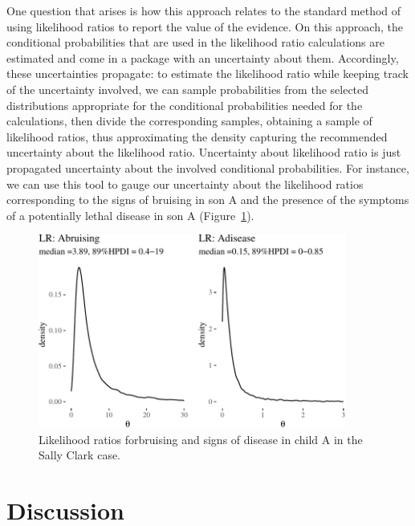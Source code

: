 \documentclass[
  letterpaper,
  DIV=11,
  numbers=noendperiod]{scrartcl}
\begin{document}
One question that arises is how this approach relates to the standard
method of using likelihood ratios to report the value of the evidence.
On this approach, the conditional probabilities that are used in the
likelihood ratio calculations are estimated and come in a package with
an uncertainty about them. Accordingly, these uncertainties propagate:
to estimate the likelihood ratio while keeping track of the uncertainty
involved, we can sample probabilities from the selected distributions
appropriate for the conditional probabilities needed for the
calculations, then divide the corresponding samples, obtaining a sample
of likelihood ratios, thus approximating the density capturing the
recommended uncertainty about the likelihood ratio. Uncertainty about
likelihood ratio is just propagated uncertainty about the involved
conditional probabilities. For instance, we can use this tool to gauge
our uncertainty about the likelihood ratios corresponding to the signs
of bruising in son A and the presence of the symptoms of a potentially
lethal disease in son A (Figure~\ref{fig-sclrs}).

\begin{figure}[H]

{\centering \includegraphics[width=0.9\textwidth,height=\textheight]{imp_philosophical_backup_files/figure-pdf/fig-sclrs-1.pdf}

}

\caption{\label{fig-sclrs}Likelihood ratios forbruising and signs of
disease in child A in the Sally Clark case.}

\end{figure}

\hypertarget{discussion}{%
\section{Discussion}\label{discussion}}
\end{document}
